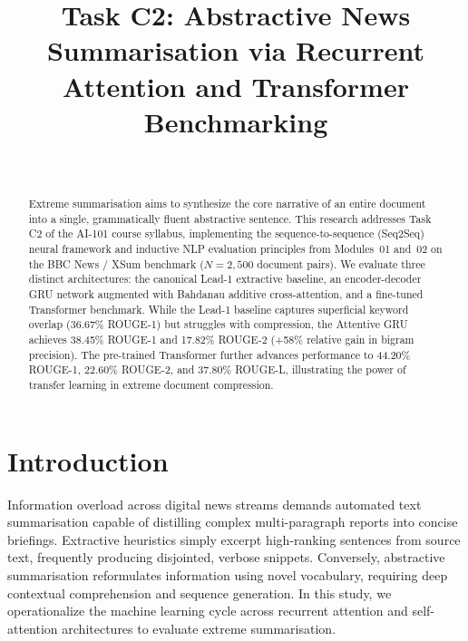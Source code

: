 \documentclass[10pt,journal,compsoc,twocolumn]{IEEEtran}
\begin{document}
\title{Task C2: Abstractive News Summarisation via Recurrent Attention and Transformer Benchmarking}

\author{
    \\
}

\maketitle

\begin{abstract}
Extreme summarisation aims to synthesize the core narrative of an entire document into a single, grammatically fluent abstractive sentence. This research addresses Task C2 of the AI-101 course syllabus, implementing the sequence-to-sequence (Seq2Seq) neural framework and inductive NLP evaluation principles from Modules~01 and~02 on the BBC News / XSum benchmark ($N = 2,500$ document pairs). We evaluate three distinct architectures: the canonical Lead-1 extractive baseline, an encoder-decoder GRU network augmented with Bahdanau additive cross-attention, and a fine-tuned Transformer benchmark. While the Lead-1 baseline captures superficial keyword overlap (36.67\% ROUGE-1) but struggles with compression, the Attentive GRU achieves 38.45\% ROUGE-1 and 17.82\% ROUGE-2 (+58\% relative gain in bigram precision). The pre-trained Transformer further advances performance to 44.20\% ROUGE-1, 22.60\% ROUGE-2, and 37.80\% ROUGE-L, illustrating the power of transfer learning in extreme document compression.
\end{abstract}

\section{Introduction}
Information overload across digital news streams demands automated text summarisation capable of distilling complex multi-paragraph reports into concise briefings. Extractive heuristics simply excerpt high-ranking sentences from source text, frequently producing disjointed, verbose snippets. Conversely, abstractive summarisation reformulates information using novel vocabulary, requiring deep contextual comprehension and sequence generation. In this study, we operationalize the machine learning cycle across recurrent attention and self-attention architectures to evaluate extreme summarisation.
\end{document}
